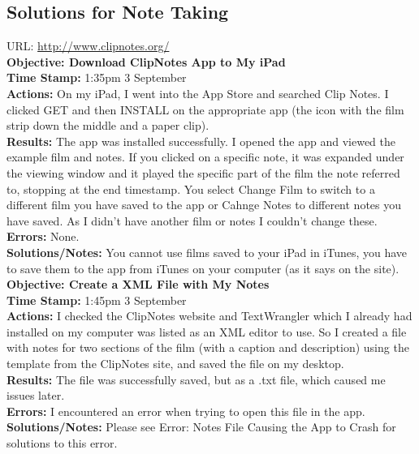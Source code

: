 \documentclass{article}
\begin{document}
\subsection{Solutions for Note Taking}
URL: \url{http://www.clipnotes.org/}\\

\textbf{Objective: Download ClipNotes App to My iPad}\\
\textbf{Time Stamp:} 1:35pm 3 September\\
\textbf{Actions:} On my iPad, I went into the App Store and searched Clip Notes. I clicked GET and then INSTALL on the appropriate app (the icon with the film strip down the middle and a paper clip).\\
\textbf{Results:} The app was installed successfully. I opened the app and viewed the example film and notes. If you clicked on a specific note, it was expanded under the viewing window and it played the specific part of the film the note referred to, stopping at the end timestamp. You select Change Film to switch to a different film you have saved to the app or Cahnge Notes to different notes you have saved. As I didn't have another film or notes I couldn't change these.\\
\textbf{Errors:} None.\\
\textbf{Solutions/Notes:} You cannot use films saved to your iPad in iTunes, you have to save them to the app from iTunes on your computer (as it says on the site).\\

\textbf{Objective: Create a XML File with My Notes}\\
\textbf{Time Stamp:} 1:45pm 3 September\\
\textbf{Actions:} I checked the ClipNotes website and TextWrangler which I already had installed on my computer was listed as an XML editor to use. So I created a file with notes for two sections of the film (with a caption and description) using the template from the ClipNotes site, and saved the file on my desktop.\\
\textbf{Results:} The file was successfully saved, but as a .txt file, which caused me issues later. \\
\textbf{Errors:} I encountered an error when trying to open this file in the app. \\
\textbf{Solutions/Notes:} Please see Error: Notes File Causing the App to Crash for solutions to this error.\\
\end{document}
